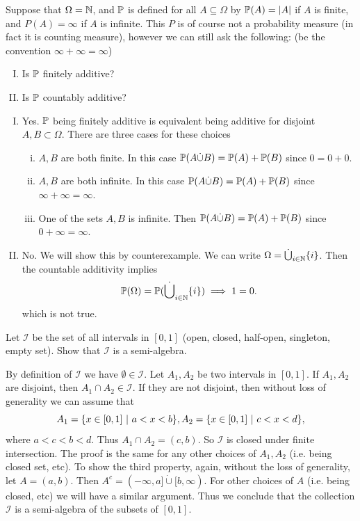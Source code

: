 \begin{problem}
	Suppose that $ \Omega = \mathbb{N} $, and $ \mathbb{P} $ is defined for all $ A \subseteq \Omega $ by $ \mathbb{P}(A) = |A| $ if $ A $ is finite, and $ P(A)=\infty $ if $ A $ is infinite.  This $ P $ is of course not a probability measure (in fact it is counting measure), however we can still ask the following: (be the convention $ \infty+\infty = \infty $)
	\begin{enumerate}[(I)]
		\item Is $ \mathbb{P} $ finitely additive?
		\item Is $ \mathbb{P} $ countably additive?
	\end{enumerate}
\end{problem}
\begin{solution}
	\begin{enumerate}[(I)]
		\item Yes. $ \mathbb{P} $ being finitely additive is equivalent being additive for disjoint $ A,B \subset \Omega $. There are three cases for these choices
		\begin{enumerate}[(i)]
			\item $ A,B $ are both finite. In this case $ \mathbb{P}(A\dot\cup B) = \mathbb{P}(A) + \mathbb{P}(B) $ since $ 0=0+0 $.
			\item $ A,B $ are both infinite. In this case $ \mathbb{P}(A\dot\cup B) = \mathbb{P}(A) + \mathbb{P}(B) $ since $ \infty+\infty = \infty $.
			\item One of the sets $ A,B $ is infinite. Then $ \mathbb{P}(A\dot\cup B) = \mathbb{P}(A) + \mathbb{P}(B) $ since $ 0+\infty = \infty. $
		\end{enumerate}
		\item No. We will show this by counterexample. We can write $ \Omega = \dot\bigcup_{i\in \mathbb{N}}\{i\} $. Then the countable additivity implies
		\[ \mathbb{P}(\Omega) = \mathbb{P}(\dot\bigcup_{i\in \mathbb{N}}\{i\}) \implies 1 = 0.\]
		which is not true.
	\end{enumerate}
\end{solution}


\begin{problem}
	Let $ \mathcal{I} $ be the set of all intervals in $ [0,1] $ (open, closed, half-open, singleton, empty set). Show that $ \mathcal{I} $ is a semi-algebra.
\end{problem}
\begin{solution}
	By definition of $ \mathcal{I} $ we have $ \emptyset\in \mathcal{I} $. Let $ A_1, A_2 $ be two intervals in $ [0,1] $. If $ A_1,A_2 $ are disjoint, then $ A_1\cap A_2 \in \mathcal{I} $. If they are not disjoint, then without loss of generality we can assume that 
	\[ A_1 = \{x\in[0,1]\ |\ a<x<b\}, A_2 = \{x\in[0,1]\ |\ c<x<d\}, \]
	where $ a<c<b<d $. Thus $ A_1\cap A_2 = (c,b) $. So $ \mathcal{I} $ is closed under finite intersection. The proof is the same for any other choices of $ A_1,A_2 $ (i.e. being closed set, etc). To show the third property, again, without the loss of generality, let $ A = (a,b) $. Then $ A^c = (-\infty,a] \dot\cup [b,\infty) $. For other choices of $ A $ (i.e. being closed, etc) we will have a similar argument. Thus we conclude that the collection $ \mathcal{I} $ is a semi-algebra of the subsets of $ [0,1] $.
\end{solution}

